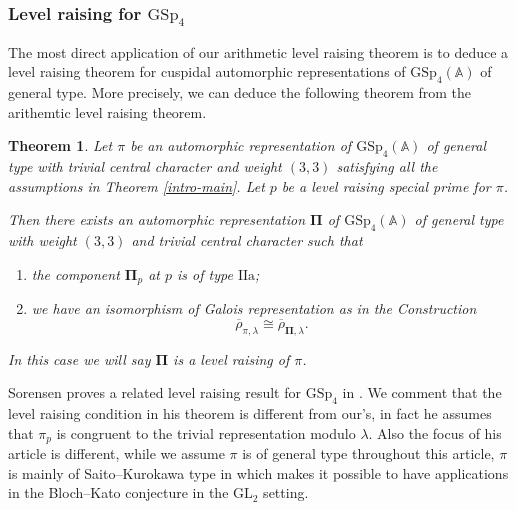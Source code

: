 \documentclass[10pt]{amsart}
\numberwithin{equation}{section}
\newtheorem{theorem}[equation]{Theorem}
\theoremstyle{definition}
\def\GL{\mathrm{GL}}
\def\GSp{\mathrm{GSp}}
\def\rma{\mathrm{a}}
\def\rmI{\mathrm{I}}
\begin{document}
\subsubsection{Level raising for $\GSp_{4}$} The most direct application of our arithmetic level raising theorem is to deduce a level raising theorem for 
cuspidal automorphic representations of $\GSp_{4}(\mathbb{A})$ of general type. More precisely, we can deduce the following theorem from the arithemtic level raising theorem.
\begin{theorem}\label{intro-level-raise}
Let $\pi$ be an automorphic representation of $\GSp_{4}(\mathbb{A})$ of general type with trivial central character and weight $(3,3)$ satisfying all the assumptions in Theorem \ref{intro-main}. Let $p$ be a level raising special prime for $\pi$. 

Then there exists an automorphic representation $\mathbf{\Pi}$ of $\GSp_{4}(\mathbb{A})$ of general type with weight $(3,3)$ and trivial central character such that
\begin{enumerate}
\item the component $\mathbf{\Pi}_{p}$ at $p$ is of type $\rmI\rmI\rma$;
\item we have an isomorphism of Galois representation as in the Construction 
\begin{equation*}
\overline{\rho}_{\pi, \lambda}\cong \overline{\rho}_{\mathbf{\Pi}, \lambda}.
\end{equation*}
\end{enumerate}
In this case we will say $\mathbf{\Pi}$ is a level raising of $\pi$. 
\end{theorem}
Sorensen proves a related level raising result for $\GSp_{4}$ in \cite{Sor-level-raising}. We comment that the level raising condition in his theorem is different from our's, in fact he assumes that $\pi_{p}$ is congruent to the trivial representation modulo $\lambda$. Also the focus of his article is different, while we assume $\pi$ is of general type throughout this article, $\pi$ is mainly of Saito--Kurokawa type in  \cite{Sor-level-raising} which makes it possible to have applications in the Bloch--Kato conjecture in the $\GL_{2}$ setting. 
\end{document}
